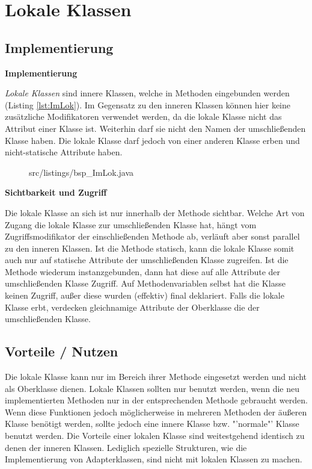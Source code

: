 \section{Lokale Klassen}
\subsection {Implementierung}

{\bf Implementierung}

{\it Lokale Klassen} sind innere Klassen, welche in Methoden eingebunden werden (Listing \ref{lst:ImLok}).
Im Gegensatz zu den inneren Klassen können hier keine zusätzliche Modifikatoren verwendet werden, da die lokale Klasse nicht das Attribut einer Klasse ist.
Weiterhin darf sie nicht den Namen der umschließenden Klasse haben.
Die lokale Klasse darf jedoch von einer anderen Klasse erben und nicht-statische Attribute haben.
\\
\begin{figure}[h]
\lstset{language=Java}
 {src/listings/bsp_ImLok.java}
\end{figure}
\newpage

{\bf Sichtbarkeit und Zugriff}

Die lokale Klasse an sich ist nur innerhalb der Methode sichtbar.
Welche Art von Zugang die lokale Klasse zur umschließenden Klasse hat, hängt vom Zugriffsmodifikator der einschließenden Methode ab, verläuft aber sonst parallel zu den inneren Klassen.
Ist die Methode statisch, kann die lokale Klasse somit auch nur auf statische Attribute der umschließenden Klasse zugreifen.
Ist die Methode wiederum instanzgebunden, dann hat diese auf alle Attribute der umschließenden Klasse Zugriff.
Auf Methodenvariablen selbst hat die Klasse keinen Zugriff, außer diese wurden (effektiv) final deklariert.
Falls die lokale Klasse erbt, verdecken gleichnamige Attribute der Oberklasse die der umschließenden Klasse.

\subsection{Vorteile / Nutzen}

Die lokale Klasse kann nur im Bereich ihrer Methode eingesetzt werden und nicht als Oberklasse dienen.
Lokale Klassen sollten nur benutzt werden, wenn die neu implementierten Methoden nur in der entsprechenden Methode gebraucht werden.
Wenn diese Funktionen jedoch möglicherweise in mehreren Methoden der äußeren Klasse benötigt werden, sollte jedoch eine innere Klasse bzw. "'normale"' Klasse benutzt werden.
Die Vorteile einer lokalen Klasse sind weitestgehend identisch zu denen der inneren Klassen. Lediglich spezielle Strukturen, wie die Implementierung von Adapterklassen, sind nicht mit lokalen Klassen zu machen.

